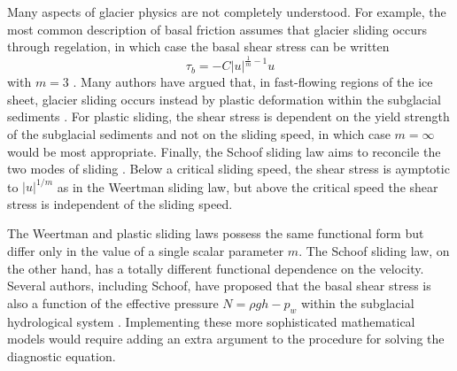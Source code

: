 \documentclass{article}
\theoremstyle{definition}
\theoremstyle{plain}
\begin{document}
Many aspects of glacier physics are not completely understood.
For example, the most common description of basal friction assumes that glacier sliding occurs through regelation, in which case the basal shear stress can be written
\begin{equation}
    \tau_b = -C|u|^{\frac{1}{m} - 1}u
    \label{eq:weertman-sliding}
\end{equation}
with $m = 3$ \citep{weertman1957sliding}.
Many authors have argued that, in fast-flowing regions of the ice sheet, glacier sliding occurs instead by plastic deformation within the subglacial sediments \citep{tulaczyk2000basal}.
For plastic sliding, the shear stress is dependent on the yield strength of the subglacial sediments and not on the sliding speed, in which case $m = \infty$ would be most appropriate.
Finally, the Schoof sliding law aims to reconcile the two modes of sliding \citep{schoof2005effect}.
Below a critical sliding speed, the shear stress is aymptotic to $|u|^{1/m}$ as in the Weertman sliding law, but above the critical speed the shear stress is independent of the sliding speed.

The Weertman and plastic sliding laws possess the same functional form but differ only in the value of a single scalar parameter $m$.
The Schoof sliding law, on the other hand, has a totally different functional dependence on the velocity.
Several authors, including Schoof, have proposed that the basal shear stress is also a function of the effective pressure $N = \rho gh - p_w$ within the subglacial hydrological system \citep{budd1979empirical, schoof2005effect}.
Implementing these more sophisticated mathematical models would require adding an extra argument to the procedure for solving the diagnostic equation.
\end{document}
